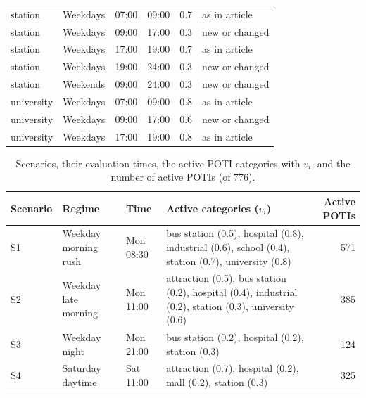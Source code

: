 \begin{table}[htbp]
\begin{tabular}{llllrl}
station & Weekdays & 07:00 & 09:00 & 0.7 & as in article \\
station & Weekdays & 09:00 & 17:00 & 0.3 & new or changed \\
station & Weekdays & 17:00 & 19:00 & 0.7 & as in article \\
station & Weekdays & 19:00 & 24:00 & 0.3 & new or changed \\
station & Weekends & 09:00 & 24:00 & 0.3 & new or changed \\
university & Weekdays & 07:00 & 09:00 & 0.8 & as in article \\
university & Weekdays & 09:00 & 17:00 & 0.6 & new or changed \\
university & Weekdays & 17:00 & 19:00 & 0.8 & as in article \\
\bottomrule
\end{tabular}
\end{table}

\begin{table}[htbp]
\centering
\small
\caption{Scenarios, their evaluation times, the active POTI categories with $v_i$, and the number of active POTIs (of 776).}
\label{tab:scenarios}
\begin{tabular}{llllr}
\toprule
Scenario & Regime & Time & Active categories ($v_i$) & Active POTIs \\
\midrule
S1 & Weekday morning rush & Mon 08:30 & bus station (0.5), hospital (0.8), industrial (0.6), school (0.4), station (0.7), university (0.8) & 571 \\
S2 & Weekday late morning & Mon 11:00 & attraction (0.5), bus station (0.2), hospital (0.4), industrial (0.2), station (0.3), university (0.6) & 385 \\
S3 & Weekday night & Mon 21:00 & bus station (0.2), hospital (0.2), station (0.3) & 124 \\
S4 & Saturday daytime & Sat 11:00 & attraction (0.7), hospital (0.2), mall (0.2), station (0.3) & 325 \\
\bottomrule
\end{tabular}
\end{table}

